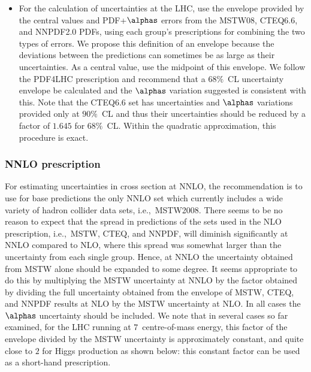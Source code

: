 \begin{itemize}

\item For the  calculation of uncertainties at the LHC, use  the
  envelope provided by the central values and PDF+$\alphas$ errors
  from the MSTW08, CTEQ6.6, and NNPDF2.0 PDFs, using each group's
  prescriptions for combining the two types of errors. We propose this
  definition of an envelope because the deviations between the
  predictions can sometimes be  as large as  their uncertainties. 
  As a central value, use the midpoint of this
  envelope. We follow the PDF4LHC prescription and
  recommend that a $68\%$~CL uncertainty envelope be
  calculated and the $\alphas$ variation suggested is consistent with
  this. Note that the CTEQ6.6 set has uncertainties and $\alphas$
  variations provided only at $90\%$~CL and thus their uncertainties
  should be reduced by a factor of $1.645$ for $68\%$~CL. Within the
  quadratic approximation, this procedure is exact.  


\end{itemize}



\subsubsection{NNLO prescription}

For estimating uncertainties in cross section at NNLO, the 
recommendation is to use for base predictions 
the only NNLO set which currently includes a wide variety of hadron 
collider data sets, i.e.,\ MSTW2008. There seems to be
no reason to expect that the spread in predictions of the sets used in the 
NLO prescription, i.e.,\ MSTW, CTEQ, and NNPDF,  will diminish significantly 
at NNLO compared to NLO, where this spread was somewhat larger than the 
uncertainty from each single group. 
Hence, at NNLO the uncertainty obtained from MSTW alone should be expanded 
to some degree. It seems appropriate to do this by multiplying the MSTW 
uncertainty at NNLO by the factor obtained by dividing the full uncertainty 
obtained from the envelope of MSTW, CTEQ, and NNPDF results at NLO by the 
MSTW uncertainty at NLO. In all cases the $\alphas$ uncertainty should be 
included. We note that in several cases so far examined, for the LHC running at 
$7$\UTeV\ centre-of-mass energy, this factor of the envelope divided by the 
MSTW uncertainty is approximately constant, and 
quite close to $2$ for Higgs production as shown below: 
this constant factor can be used as a 
short-hand prescription. 


